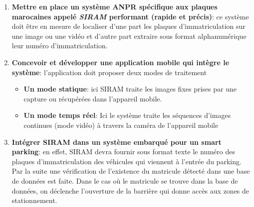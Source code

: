         \begin{enumerate}
            \item \textbf{Mettre en place un système ANPR spécifique aux plaques marocaines appelé \textit{SIRAM} performant (rapide et précis)}: ce système doit être en mesure de localiser d’une part  les plaques d’immatriculation sur une image ou une vidéo et d’autre part extraire sous format alphanumérique leur numéro d’immatriculation.
            \item \textbf{Concevoir et développer une application mobile qui intègre le système}: l’application doit proposer deux modes de traitement
                \begin{itemize}
                    \item \textbf{Un mode statique}: ici SIRAM traite les images fixes prises par une capture ou récupérées dans l’appareil mobile.
                    \item \textbf{Un mode temps réel}: Ici le système traite les séquences d’images continues (mode vidéo) à travers la caméra de l’appareil mobile
                \end{itemize}
            \item \textbf{Intégrer SIRAM dans un système embarqué pour un smart parking}: en effet, SIRAM devra fournir sous format texte le numéro des plaques d’immatriculation des véhicules qui viennent à l’entrée du parking. Par la suite une vérification de l’existence du matricule détecté dans une base de données est faite. Dans le cas où le matricule se trouve dans la base de données, on déclenche l’ouverture de la barrière qui donne accès aux zones de stationnement.
        \end{enumerate}


